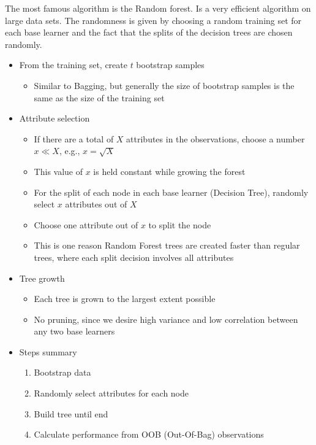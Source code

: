 \vspace{10pt}

The most famous algorithm is the Random forest. Is a very efficient algorithm on large data sets. The randomness is given by choosing a random training set for each base learner and the fact that the splits of the decision trees are chosen randomly.

\begin{itemize}
    \item From the training set, create $t$ bootstrap samples
    \begin{itemize}
        \item Similar to Bagging, but generally the size of bootstrap samples is the same as the size of the training set
    \end{itemize}

    \item Attribute selection
    \begin{itemize}
        \item If there are a total of $X$ attributes in the observations, choose a number $x \ll X$, e.g., $x = \sqrt{X}$
        \item This value of $x$ is held constant while growing the forest
        \item For the split of each node in each base learner (Decision Tree), randomly select $x$ attributes out of $X$
        \item Choose one attribute out of $x$ to split the node
        \item This is one reason Random Forest trees are created faster than regular trees, where each split decision involves all attributes
    \end{itemize}

    \item Tree growth
    \begin{itemize}
        \item Each tree is grown to the largest extent possible
        \item No pruning, since we desire high variance and low correlation between any two base learners
    \end{itemize}

    \item Steps summary
    \begin{enumerate}
        \item Bootstrap data
        \item Randomly select attributes for each node
        \item Build tree until end
        \item Calculate performance from OOB (Out-Of-Bag) observations
    \end{enumerate}
\end{itemize}


